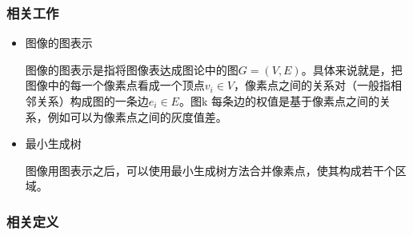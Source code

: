 \documentclass[a4paper, 12pt, UTF8]{article}
\begin{document}
\subsubsection{相关工作}

\begin{itemize}

\item 图像的图表示

图像的图表示是指将图像表达成图论中的图$G = (V, E)$。具体来说就是，把图像中的每一个像素点看成一个顶点$v_i \in V$，像素点之间的关系对（一般指相邻关系）构成图的一条边$e_i \in E$。图k 每条边的权值是基于像素点之间的关系，例如可以为像素点之间的灰度值差。

\item 最小生成树

图像用图表示之后，可以使用最小生成树方法合并像素点，使其构成若干个区域。

\end{itemize}

\subsubsection{相关定义}
\end{document}
